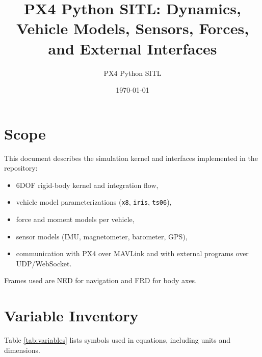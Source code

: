 \documentclass[11pt,a4paper]{article}
\title{PX4 Python SITL: Dynamics, Vehicle Models, Sensors, Forces, and External Interfaces}
\author{PX4 Python SITL}
\date{\today}
\begin{document}
\maketitle
\tableofcontents
\clearpage

\section{Scope}
This document describes the simulation kernel and interfaces implemented in the repository:
\begin{itemize}
    \item 6DOF rigid-body kernel and integration flow,
    \item vehicle model parameterizations (\texttt{x8}, \texttt{iris}, \texttt{ts06}),
    \item force and moment models per vehicle,
    \item sensor models (IMU, magnetometer, barometer, GPS),
    \item communication with PX4 over MAVLink and with external programs over UDP/WebSocket.
\end{itemize}
Frames used are NED for navigation and FRD for body axes.

\section{Variable Inventory}
Table \ref{tab:variables} lists symbols used in equations, including units and dimensions.
\end{document}
